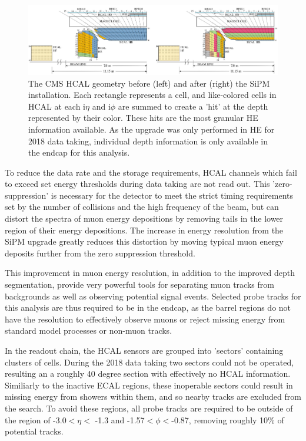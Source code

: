 \begin{figure}[!htpb]
	   \centering
	      \includegraphics[width=\textwidth]{figures/HE_upgrade.jpg}
		 \caption[The 2018 HE upgrade]{The CMS HCAL geometry before (left) and after (right) the SiPM installation. Each rectangle represents a cell, and like-colored cells in HCAL at each i$\eta$ and i$\phi$ are summed to create a 'hit' at the depth represented by their color. These hits are the most granular HE information available. As the upgrade was only performed in HE for 2018 data taking, individual depth information is only available in the endcap for this analysis.}
	    \label{fig:HElayout}
\end{figure}

To reduce the data rate and the storage requirements, HCAL channels which fail to exceed set energy thresholds during data taking are not read out. 
This 'zero-suppression' is necessary for the detector to meet the strict timing requirements set by the number of collisions and the high frequency of the beam, but can distort the spectra of muon energy depositions by removing tails in the lower region of their energy depositions.
The increase in energy resolution from the SiPM upgrade greatly reduces this distortion by moving typical muon energy deposits further from the zero suppression threshold.
 
This improvement in muon energy resolution, in addition to the improved depth segmentation, provide very powerful tools for separating muon tracks from backgrounds as well as observing potential signal events.
Selected probe tracks for this analysis are thus required to be in the endcap, as the barrel regions do not have the resolution to effectively observe muons or reject missing energy from standard model processes or non-muon tracks.

In the readout chain, the HCAL sensors are grouped into 'sectors' containing clusters of cells. During the 2018 data taking two sectors could not be operated, resulting an a roughly 40 degree section with effectively no HCAL information. Similiarly to the inactive ECAL regions, these inoperable sectors could result in missing energy from showers within them, and so nearby tracks are excluded from the search. 
To avoid these regions, all probe tracks are required to be outside of the region of -3.0$<\eta<$ -1.3 and -1.57$<\phi<$-0.87, removing roughly 10$\%$ of potential tracks.

